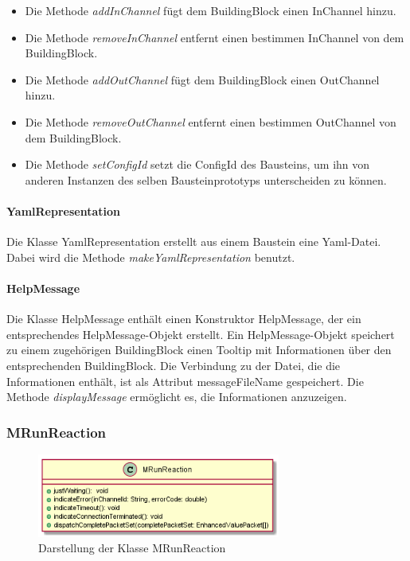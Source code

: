 \documentclass[parskip=full]{scrartcl}
\begin{document}
\begin{itemize}

\item Die Methode \textit{addInChannel} fügt dem BuildingBlock einen InChannel hinzu.
\item Die Methode \textit{removeInChannel} entfernt einen bestimmen InChannel von dem BuildingBlock.
\item Die Methode \textit{addOutChannel} fügt dem BuildingBlock einen OutChannel hinzu.
\item Die Methode \textit{removeOutChannel} entfernt einen bestimmen OutChannel von dem BuildingBlock.
\item Die Methode \textit{setConfigId} setzt die ConfigId des Bausteins, um ihn von anderen Instanzen des selben Bausteinprototyps unterscheiden zu können. 
\end{itemize}





\paragraph{YamlRepresentation}

Die Klasse YamlRepresentation erstellt aus einem Baustein eine Yaml-Datei. Dabei wird die Methode \textit{makeYamlRepresentation} benutzt.


\paragraph{HelpMessage}
Die Klasse HelpMessage enthält einen Konstruktor HelpMessage, der ein entsprechendes HelpMessage-Objekt erstellt.
Ein HelpMessage-Objekt speichert zu einem zugehörigen BuildingBlock einen Tooltip mit Informationen über den entsprechenden BuildingBlock. Die Verbindung zu der Datei, die die Informationen enthält, ist als Attribut messageFileName gespeichert. Die Methode
\textit{displayMessage} ermöglicht es, die Informationen anzuzeigen.



\subsubsection{MRunReaction}

\begin{figure}[htbp]
	\begin{center}
		\includegraphics[width = 8cm]{Grafiken/MRunReaction.PNG}
		\caption{Darstellung der Klasse MRunReaction}
		\label{MRunReaction}
	\end{center}
\end{figure}
\end{document}
